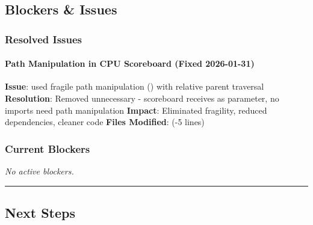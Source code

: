 \subsection{Blockers \& Issues}\label{cr:status:pyuvm-migration:blockers-issues}

\subsubsection{\texorpdfstring{\ok{} Resolved Issues}{ Resolved Issues}}\label{cr:status:pyuvm-migration:white-check-mark-resolved-issues}

\paragraph{Path Manipulation in CPU Scoreboard (Fixed 2026-01-31)}\label{cr:status:pyuvm-migration:path-manipulation-in-cpu-scoreboard-fixed-2026-01-31}

\begin{record}

\textbf{Issue}:  used fragile path manipulation
() with relative parent traversal
\textbf{Resolution}: Removed unnecessary  -
scoreboard receives  as parameter, no imports need path
manipulation \textbf{Impact}: Eliminated fragility, reduced
dependencies, cleaner code \textbf{Files Modified}:
 (-5 lines)

\end{record}

\subsubsection{Current Blockers}\label{cr:status:pyuvm-migration:current-blockers}

\begin{record}

\emph{No active blockers.}

\begin{center}\rule{0.5\linewidth}{0.5pt}\end{center}

\end{record}

\subsection{Next Steps}\label{cr:status:pyuvm-migration:next-steps}

